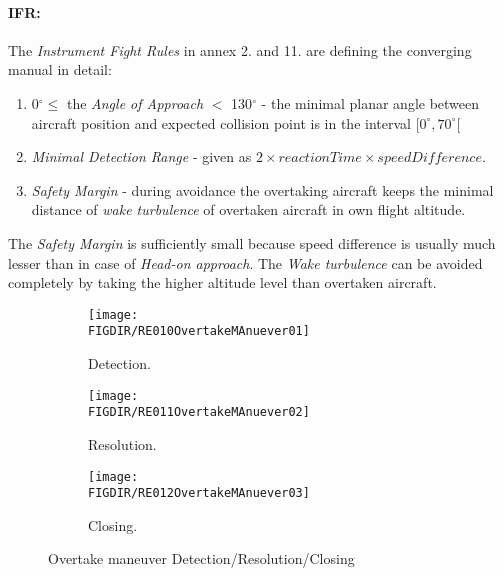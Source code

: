 \paragraph{IFR:} The \emph{Instrument Fight Rules} in annex 2. \cite{icaoAnnex2} and 11. \cite{icaoAnnex11} are defining the converging manual in detail:

\begin{enumerate}
    \item 0$^\circ \le$ the \emph{Angle of Approach} $<$ 130$^\circ$ - the minimal planar angle between aircraft position and expected collision point is in the interval $[0^\circ,70^\circ[$
    
    \item \emph{Minimal Detection Range} - given as $2 \times  reaction Time \times speed Difference$. 
    
    \item \emph{Safety Margin} - during avoidance the overtaking aircraft keeps the minimal distance of \emph{wake turbulence} of overtaken aircraft in own flight altitude. 
\end{enumerate}

\begin{note}
    The \emph{Safety Margin} is sufficiently small because speed difference is usually much lesser than in case of  \emph{Head-on approach}. The \emph{Wake turbulence} can be avoided completely by taking the higher altitude level than overtaken aircraft.
\end{note}



\begin{figure}[H]
	\centering
    \begin{subfigure}{0.32\textwidth}
        \texttt{[image: \\FIGDIR/RE010OvertakeMAnuever01]} 
        \caption{Detection.}
        \label{fig:OvertakeManeuverTheoreticalDetection}
    \end{subfigure}
    \begin{subfigure}{0.32\textwidth}
        \texttt{[image: \\FIGDIR/RE011OvertakeMAnuever02]} 
        \caption{Resolution.}
        \label{fig:OvertakeManeuverTheoreticalResolution}
    \end{subfigure}
    \begin{subfigure}{0.32\textwidth}
        \texttt{[image: \\FIGDIR/RE012OvertakeMAnuever03]} 
        \caption{Closing.}
        \label{fig:OvertakeManeuverTheoreticalClosure}
    \end{subfigure}
    \caption{Overtake maneuver Detection/Resolution/Closing}
    \label{fig:OvertakeManeuverTheoretical}
\end{figure}


